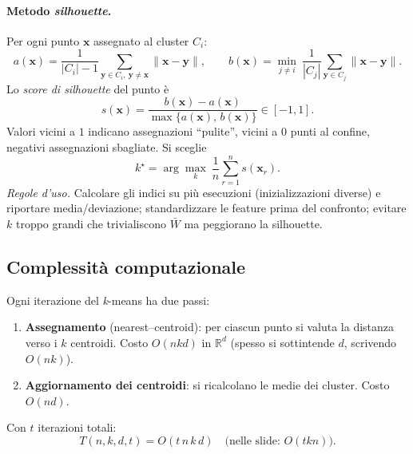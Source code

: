\paragraph{Metodo \emph{silhouette}.}
Per ogni punto $\mathbf{x}$ assegnato al cluster $C_i$:
\[
a(\mathbf{x})=\frac{1}{|C_i|-1}\sum_{\mathbf{y}\in C_i,\ \mathbf{y}\neq \mathbf{x}}\!\!\!\!\|\mathbf{x}-\mathbf{y}\|, \qquad
b(\mathbf{x})=\min_{j\neq i}\ \frac{1}{|C_j|}\sum_{\mathbf{y}\in C_j}\|\mathbf{x}-\mathbf{y}\|.
\]
Lo \emph{score di silhouette} del punto è
\[
s(\mathbf{x})=\frac{b(\mathbf{x})-a(\mathbf{x})}{\max\{a(\mathbf{x}),\,b(\mathbf{x})\}}\in[-1,1].
\]
Valori vicini a $1$ indicano assegnazioni “pulite”, vicini a $0$ punti al confine, negativi assegnazioni sbagliate. Si sceglie
\[
k^\star=\arg\max_k\ \frac{1}{n}\sum_{r=1}^n s(\mathbf{x}_r).
\]
\emph{Regole d’uso.} Calcolare gli indici su più esecuzioni (inizializzazioni diverse) e riportare media/deviazione; standardizzare le feature prima del confronto; evitare $k$ troppo grandi che trivialiscono $\bar W$ ma peggiorano la silhouette.


\subsection{Complessità computazionale}\label{subsec:kmeans-compl}
Ogni iterazione del \emph{k}-means ha due passi:
\begin{enumerate}
  \item \textbf{Assegnamento} (nearest–centroid): per ciascun punto si valuta la distanza verso i $k$ centroidi. Costo $O(nkd)$ in $\mathbb{R}^d$ (spesso si sottintende $d$, scrivendo $O(nk)$).
  \item \textbf{Aggiornamento dei centroidi}: si ricalcolano le medie dei cluster. Costo $O(nd)$.
\end{enumerate}
Con $t$ iterazioni totali:
\[
T(n,k,d,t)=O(t\,n\,k\,d)\quad\text{(nelle slide: }O(tkn)\text{)}.
\]
